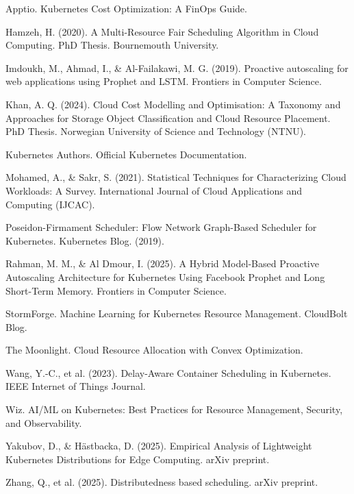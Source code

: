 \begin{thebibliography}{99}

	
	Apptio. Kubernetes Cost Optimization: A FinOps Guide.
	
	Hamzeh, H. (2020). A Multi-Resource Fair Scheduling Algorithm in Cloud Computing. PhD Thesis. Bournemouth University.
	
	Imdoukh, M., Ahmad, I., \& Al-Failakawi, M. G. (2019). Proactive autoscaling for web applications using Prophet and LSTM. Frontiers in Computer Science.
	
	Khan, A. Q. (2024). Cloud Cost Modelling and Optimisation: A Taxonomy and Approaches for Storage Object Classification and Cloud Resource Placement. PhD Thesis. Norwegian University of Science and Technology (NTNU).
	
	Kubernetes Authors. Official Kubernetes Documentation.
	
	Mohamed, A., \& Sakr, S. (2021). Statistical Techniques for Characterizing Cloud Workloads: A Survey. International Journal of Cloud Applications and Computing (IJCAC).
	
	Poseidon-Firmament Scheduler: Flow Network Graph-Based Scheduler for Kubernetes. Kubernetes Blog. (2019).
	
	Rahman, M. M., \& Al Dmour, I. (2025). A Hybrid Model-Based Proactive Autoscaling Architecture for Kubernetes Using Facebook Prophet and Long Short-Term Memory. Frontiers in Computer Science.
	
	StormForge. Machine Learning for Kubernetes Resource Management. CloudBolt Blog.
	
	The Moonlight. Cloud Resource Allocation with Convex Optimization.
	
	Wang, Y.-C., et al. (2023). Delay-Aware Container Scheduling in Kubernetes. IEEE Internet of Things Journal.
	
	Wiz. AI/ML on Kubernetes: Best Practices for Resource Management, Security, and Observability.
	
	Yakubov, D., \& Hästbacka, D. (2025). Empirical Analysis of Lightweight Kubernetes Distributions for Edge Computing. arXiv preprint.
	
	Zhang, Q., et al. (2025). Distributedness based scheduling. arXiv preprint.
	

\end{thebibliography}
